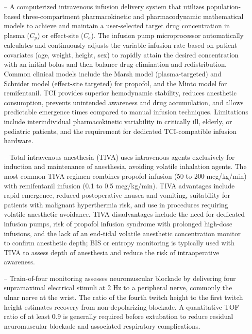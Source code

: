 -- A computerized intravenous infusion delivery system that utilizes population-based three-compartment pharmacokinetic and pharmacodynamic mathematical models to achieve and maintain a user-selected target drug concentration in plasma ($C_p$) or effect-site ($C_e$). The infusion pump microprocessor automatically calculates and continuously adjusts the variable infusion rate based on patient covariates (age, weight, height, sex) to rapidly attain the desired concentration with an initial bolus and then balance drug elimination and redistribution. Common clinical models include the Marsh model (plasma-targeted) and Schnider model (effect-site targeted) for propofol, and the Minto model for remifentanil. TCI provides superior hemodynamic stability, reduces anesthetic consumption, prevents unintended awareness and drug accumulation, and allows predictable emergence times compared to manual infusion techniques. Limitations include interindividual pharmacokinetic variability in critically ill, elderly, or pediatric patients, and the requirement for dedicated TCI-compatible infusion hardware.

-- Total intravenous anesthesia (TIVA) uses intravenous agents exclusively for induction and maintenance of anesthesia, avoiding volatile inhalation agents. The most common TIVA regimen combines propofol infusion (50 to 200 mcg/kg/min) with remifentanil infusion (0.1 to 0.5 mcg/kg/min). TIVA advantages include rapid emergence, reduced postoperative nausea and vomiting, suitability for patients with malignant hyperthermia risk, and use in procedures requiring volatile anesthetic avoidance. TIVA disadvantages include the need for dedicated infusion pumps, risk of propofol infusion syndrome with prolonged high-dose infusions, and the lack of an end-tidal volatile anesthetic concentration monitor to confirm anesthetic depth; BIS or entropy monitoring is typically used with TIVA to assess depth of anesthesia and reduce the risk of intraoperative awareness.

-- Train-of-four monitoring assesses neuromuscular blockade by delivering four supramaximal electrical stimuli at 2 Hz to a peripheral nerve, commonly the ulnar nerve at the wrist. The ratio of the fourth twitch height to the first twitch height estimates recovery from non-depolarizing blockade. A quantitative TOF ratio of at least 0.9 is generally required before extubation to reduce residual neuromuscular blockade and associated respiratory complications.

